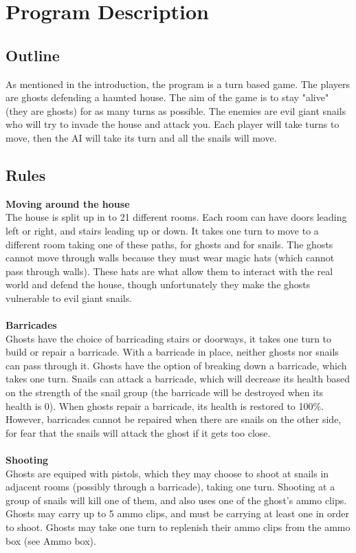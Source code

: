 \documentclass{article}
\begin{document}
\section{Program Description}

\subsection{Outline}
As mentioned in the introduction, the program is a turn based game. The players are ghosts defending a haunted house. The aim of the game is to stay "alive" (they are ghosts) for as many turns as possible. The enemies are evil giant snails who will try to invade the house and attack you. Each player will take turns to move, then the AI will take its turn and all the snails will move.

\subsection{Rules}
\textbf{Moving around the house} \\ 
The house is split up in to 21 different rooms. Each room can have doors leading left or right, and stairs leading up or down. It takes one turn to move to a different room taking one of these paths, for ghosts and for snails. The ghosts cannot move through walls because they must wear magic hats (which cannot pass through walls). These hats are what allow them to interact with the real world and defend the house, though unfortunately they make the ghosts vulnerable to evil giant snails.\\ \\
\textbf{Barricades} \\
Ghosts have the choice of barricading stairs or doorways, it takes one turn to build or repair a barricade. With a barricade in place, neither ghosts nor snails can pass through it. Ghosts have the option of breaking down a barricade, which takes one turn. Snails can attack a barricade, which will decrease its health based on the strength of the snail group (the barricade will be destroyed when its health is 0). When ghosts repair a barricade, its health is restored to 100\%. However, barricades cannot be repaired when there are snails on the other side, for fear that the snails will attack the ghost if it gets too close. \\ \\
\textbf{Shooting} \\
Ghosts are equiped with pistols, which they may choose to shoot at snails in adjacent rooms (possibly through a barricade), taking one turn. Shooting at a group of snails will kill one of them, and also uses one of the ghost's ammo clips. Ghosts may carry up to 5 ammo clips, and must be carrying at least one in order to shoot. Ghosts may take one turn to replenish their ammo clips from the ammo box (see Ammo box). \\ \\
\end{document}

